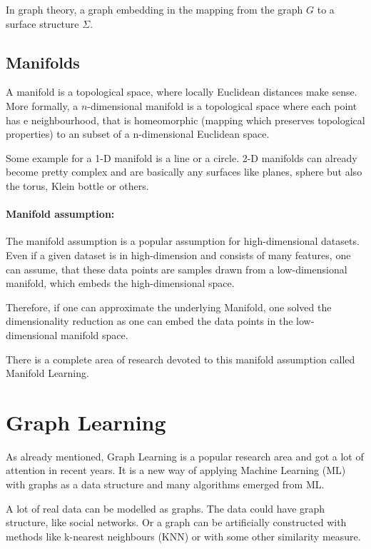 In graph theory, a graph embedding in the mapping from the graph $G$ to a surface structure $\Sigma$. 


\subsection{Manifolds}
A manifold is a topological space, where locally Euclidean distances make sense.
More formally, a $n$-dimensional manifold is a topological space where
each point has e neighbourhood, that is homeomorphic (mapping which preserves topological properties) to an subset of a n-dimensional
Euclidean space.

Some example for a 1-D manifold is a line or a circle. 2-D manifolds can already become 
pretty complex and are basically any surfaces like planes, sphere but also the torus,
Klein bottle or others.

\paragraph{Manifold assumption:}
\label{sec:manifoldAssumption}

The manifold assumption is a popular assumption for high-dimensional datasets.
Even if a given dataset is in high-dimension and consists of many features, one can assume,
that these data points are samples drawn from a low-dimensional manifold, 
which embeds the high-dimensional space.

Therefore, if one can approximate the underlying Manifold, one solved the dimensionality reduction
as one can embed the data points in the low-dimensional manifold space.

There is a complete area of research devoted to this manifold assumption called Manifold Learning\cite{ManifoldLearning}.




\section{Graph Learning}
As already mentioned, Graph Learning is a popular research area and got a lot of attention in recent years.
It is a new way of applying Machine Learning (ML) with graphs as a data structure and many algorithms emerged from ML.

A lot of real data can be modelled as graphs. The data could have graph structure, like social networks. 
Or a graph can be artificially constructed with methods like k-nearest neighbours (KNN) or with some other similarity
measure.

